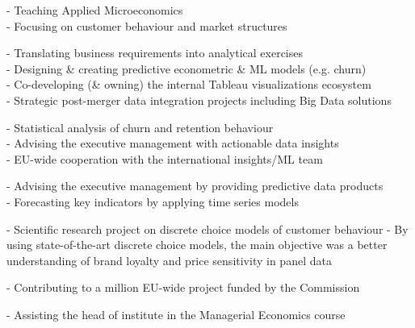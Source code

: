 \documentclass[a4paper]{twentysecondcv} %
\begin{document}
\begin{twenty}
{\small - Teaching Applied Microeconomics\\
        - Focusing on customer behaviour and market structures
}	

{\small     - Translating business requirements into analytical exercises\\
			- Designing \& creating predictive econometric \& ML models (e.g. \hspace{-6pt} churn)\\
            - Co-developing (\& owning) the internal Tableau visualizations ecosystem\\ 
            - Strategic post-merger data integration projects including Big Data solutions}

{\small     - Statistical analysis of churn and retention behaviour\\
		    - Advising the executive management with actionable data insights\\
            - EU-wide cooperation with the international insights/ML team
}

{\small - Advising the executive management by providing predictive data products\\
        - Forecasting key indicators by applying time series models
}

	
{\small - Scientific research project on discrete choice models of customer behaviour
        - By using state-of-the-art discrete choice models, the main objective was a better understanding of brand loyalty and price sensitivity in panel data
}

{\small - Contributing to a  million EU-wide project funded by the Commission}
	
{\small - Assisting the head of institute in the Managerial Economics course} \\ \\
	
\end{twenty}
\\\vspace{0.5cm}
\end{document}
